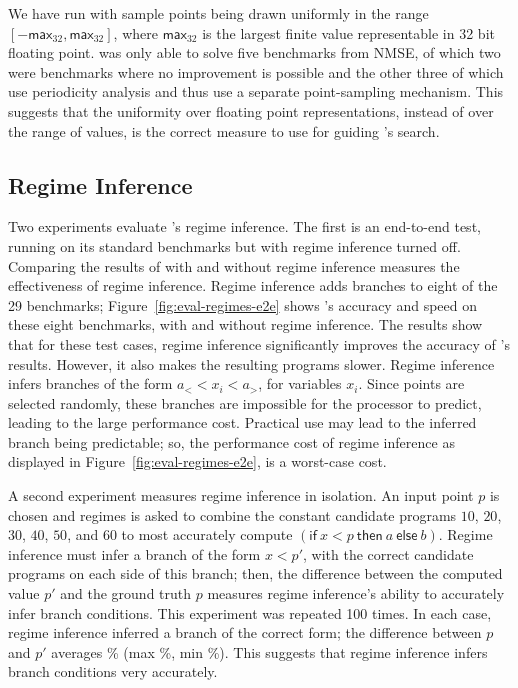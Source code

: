 \documentclass[paper.tex]{subfiles}
\begin{document}
We have run \casio with sample points being drawn uniformly in the
range $[-\mathsf{max}_{32}, \mathsf{max}_{32}]$, where $\mathsf{max}_{32}$ is the
largest finite value representable in 32 bit floating point.  \casio
was only able to solve five benchmarks from NMSE, of which two were
benchmarks where no improvement is possible and the other three of
which use periodicity analysis and thus use a separate point-sampling
mechanism.  This suggests that the uniformity over floating point
representations, instead of over the range of values, is the correct
measure to use for guiding \casio's search.

\subsection{Regime Inference} \label{sec:eval-regimes}

Two experiments evaluate \casio's regime inference.  The first is an
end-to-end test, running \casio on its standard benchmarks but with
regime inference turned off.  Comparing the results of \casio with and
without regime inference measures the effectiveness of regime
inference.  Regime inference adds branches to eight of the 29
benchmarks; Figure~\ref{fig:eval-regimes-e2e} shows \casio's accuracy
and speed on these eight benchmarks, with and without regime
inference.  The results show that for these test cases, regime
inference significantly improves the accuracy of \casio's results.
However, it also makes the resulting programs slower.  Regime
inference infers branches of the form $a_< < x_i < a_>$, for variables
$x_i$.  Since points are selected randomly, these branches are
impossible for the processor to predict, leading to the large
performance cost.  Practical use may lead to the inferred branch being
predictable; so, the performance cost of regime inference as displayed
in Figure~\ref{fig:eval-regimes-e2e}, is a worst-case cost.

A second experiment measures regime inference in isolation.  An input
point $p$ is chosen and regimes is asked to combine the constant
candidate programs $10$, $20$, $30$, $40$, $50$, and $60$ to most
accurately compute $(\mathsf{if}\:x < p\:\mathsf{then}\:a\:\mathsf{else}\:b)$.
 Regime inference must
infer a branch of the form $x < p'$, with the correct candidate
programs on each side of this branch; then, the difference between the
computed value $p'$ and the ground truth $p$ measures regime
inference's ability to accurately infer branch conditions.  This
experiment was repeated 100 times.  In each case, regime inference
inferred a branch of the correct form; the difference between $p$ and
$p'$ averages \% (max \%, min \%).  This
suggests that regime inference infers branch conditions very
accurately.
\end{document}
